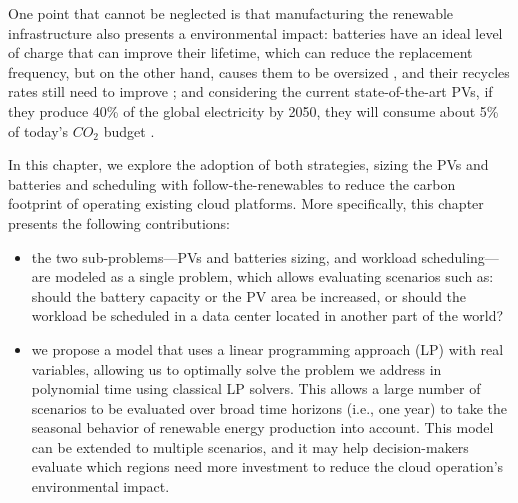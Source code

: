 One point that cannot be neglected is that manufacturing the renewable infrastructure also presents a environmental impact: batteries have an ideal level of charge that can improve their lifetime, which can reduce the replacement frequency, but on the other hand, causes them to be oversized \cite{batteries_baumman}, and their recycles rates still need to improve \cite{bateries_RAHMAN}; and considering the current state-of-the-art PVs, if they produce 40\% of the global electricity by 2050, they will consume about 5\% of today’s ${CO_2}$ budget \cite{solar_co2}.


In this chapter, we explore the adoption of both strategies, sizing the PVs and batteries and scheduling with follow-the-renewables to reduce the carbon footprint of operating existing cloud platforms. More specifically, this chapter presents the following contributions: 

\begin{itemize}
    
    \item the two sub-problems---PVs and batteries sizing, and workload scheduling--- are modeled as a single problem, which allows evaluating scenarios such as: should the battery capacity or the PV area be increased, or should the workload be scheduled in a data center located in another part of the world?
    
    \item we propose a model that uses a linear programming approach (LP) with real variables, allowing us to optimally solve the problem we address in polynomial time using classical LP solvers. This allows a large number of scenarios to be evaluated over broad time horizons (i.e., one year) to take the seasonal behavior of renewable energy production into account. This model can be extended to multiple scenarios, and it may help decision-makers evaluate which regions need more investment to reduce the cloud operation's environmental impact.

\end{itemize}


